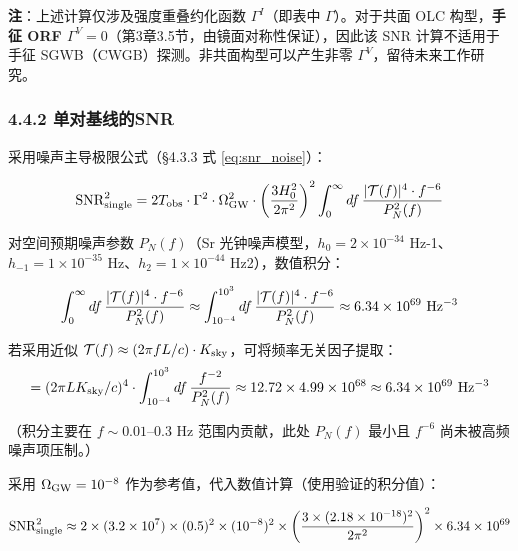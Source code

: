 \documentclass[12pt,a4paper]{article}
\begin{document}
\textbf{注}：上述计算仅涉及强度重叠约化函数 $\Gamma^I$（即表中 $\Gamma$）。对于共面 OLC 构型，\textbf{手征 ORF $\Gamma^V = 0$}（第3章3.5节，由镜面对称性保证），因此该 SNR 计算不适用于手征 SGWB（CWGB）探测。非共面构型可以产生非零 $\Gamma^V$，留待未来工作研究。

\subsubsection{4.4.2 单对基线的SNR}


采用噪声主导极限公式（§4.3.3 式 \ref{eq:snr_noise}）：

$${\rm SNR}_{\rm single}^2 = 2 T_{\rm obs} \cdot \Gamma^2 \cdot \Omega_{\rm GW}^2 \cdot \left( \frac{3H_0^2}{2\pi^2} \right)^2 \int_0^\infty df\, \frac{|\mathcal{T}(f)|^4 \cdot f^{-6}}{P_N^2(f)} \label{eq:snr_noise}$$

对空间预期噪声参数 $P_N(f)$（Sr 光钟噪声模型，$h_0=2\times 10^{-34}$ Hz-1、$h_{-1}=1\times 10^{-35}$ Hz、$h_2=1\times 10^{-44}$ Hz2），数值积分：

$$\int_0^\infty df\, \frac{|\mathcal{T}(f)|^4 \cdot f^{-6}}{P_N^2(f)} \approx \int_{10^{-4}}^{10^3} df\, \frac{|\mathcal{T}(f)|^4 \cdot f^{-6}}{P_N^2(f)} \approx 6.34 \times 10^{69} \ {\rm Hz^{-3}}$$

若采用近似 $\mathcal{T}(f) \approx (2\pi f L/c) \cdot K_{\rm sky}$，可将频率无关因子提取：
$$= (2\pi L K_{\rm sky}/c)^4 \cdot \int_{10^{-4}}^{10^3} df\, \frac{f^{-2}}{P_N^2(f)} \approx 12.72 \times 4.99 \times 10^{68} \approx 6.34 \times 10^{69} \ {\rm Hz^{-3}}$$

（积分主要在 $f \sim 0.01$–0.3 Hz 范围内贡献，此处 $P_N(f)$ 最小且 $f^{-6}$ 尚未被高频噪声项压制。）

采用 $\Omega_{\rm GW} = 10^{-8}$ 作为参考值，代入数值计算（使用验证的积分值）：

$${\rm SNR}_{\rm single}^2 \approx 2 \times (3.2 \times 10^7) \times (0.5)^2 \times (10^{-8})^2 \times \left(\frac{3 \times (2.18 \times 10^{-18})^2}{2\pi^2}\right)^2 \times 6.34 \times 10^{69}$$
\end{document}
